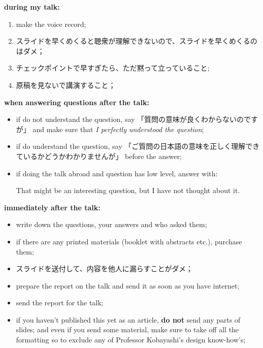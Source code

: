 \documentclass[12pt]{article} %
\begin{document}
    \textbf{during my talk:}\begin{enumerate}
        \item make the voice record;
	    \item スライドを早くめくると聴衆が理解できないので、スライドを早くめくるのはダメ；
	    \item チェックポイントで早すぎたら、ただ黙って立っていること;
	    \item 原稿を見ないで講演すること；
    \end{enumerate}
	\textbf{when answering questions after the talk:}
	\begin{itemize}
		\item if do not understand the question, say 「質問の意味が良くわからないのですが」 and make sure that \textit{I perfectly understood the question};
		\item if do understand the question, say 「ご質問の日本語の意味を正しく理解できているかどうかわかりませんが」 before the answer;
		\item if doing the talk abroad and question has low level, answer with:\begin{center}
				That might be an interesting question,
				but I have not thought about it.
			\end{center}
	\end{itemize}
	\textbf{immediately after the talk:}
	\begin{itemize}
        \item write down the questions, your answers and who asked them;
		\item if there are any printed materials (booklet with abstracts etc.), purchase them;
		\item スライドを送付して、内容を他人に漏らすことがダメ；
		\item prepare the report on the talk and send it as soon as you have internet;
        \item send the report for the talk;
        \item if you haven't published this yet as an article, \textbf{do not} send any parts of slides;
            and even if you send some material, make sure to take off all the formatting so to exclude
            any of Professor Kobayashi's design know-how's;
	\end{itemize}
\end{document}
